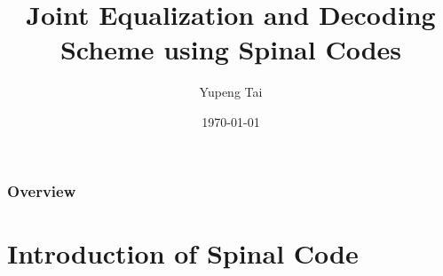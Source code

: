 \documentclass{beamer}
\title[Joint Equalization]{Joint Equalization and Decoding Scheme using Spinal Codes} %
\author{Yupeng Tai} %
\institute[] %
{
\medskip
\textit{yptai@outlook.com} %
}
\date{\today} %
\begin{document}
\begin{frame}
\titlepage %
\end{frame}

\begin{frame}
\frametitle{Overview} %
\tableofcontents %
\end{frame}

\section{Introduction of Spinal Code}
\end{document}

